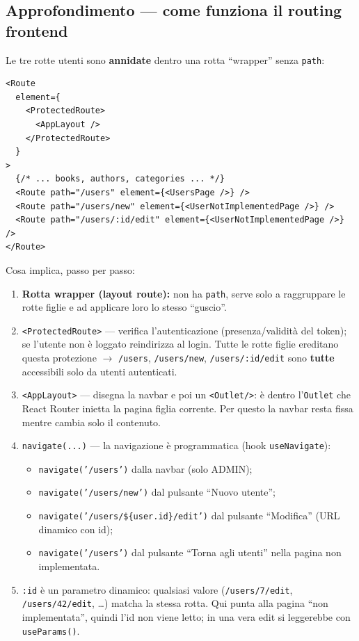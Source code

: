 \documentclass[11pt,a4paper]{article}
\newcommand{\code}[1]{\texttt{\small #1}}
\begin{document}
\subsection{Approfondimento --- come funziona il routing frontend}

Le tre rotte utenti sono \textbf{annidate} dentro una rotta ``wrapper'' senza
\code{path}:

\begin{lstlisting}[language=TypeScriptX]
<Route
  element={
    <ProtectedRoute>
      <AppLayout />
    </ProtectedRoute>
  }
>
  {/* ... books, authors, categories ... */}
  <Route path="/users" element={<UsersPage />} />
  <Route path="/users/new" element={<UserNotImplementedPage />} />
  <Route path="/users/:id/edit" element={<UserNotImplementedPage />} />
</Route>
\end{lstlisting}

Cosa implica, passo per passo:

\begin{enumerate}[leftmargin=1.6em]
  \item \textbf{Rotta wrapper (layout route):} non ha \code{path}, serve solo a
        raggruppare le rotte figlie e ad applicare loro lo stesso ``guscio''.
  \item \code{<ProtectedRoute>} --- verifica l'autenticazione (presenza/validità del
        token); se l'utente non è loggato reindirizza al login. Tutte le rotte
        figlie ereditano questa protezione $\rightarrow$ \code{/users},
        \code{/users/new}, \code{/users/:id/edit} sono \textbf{tutte} accessibili
        solo da utenti autenticati.
  \item \code{<AppLayout>} --- disegna la navbar e poi un \code{<Outlet/>}: è dentro
        l'\code{Outlet} che React Router inietta la pagina figlia corrente. Per
        questo la navbar resta fissa mentre cambia solo il contenuto.
  \item \code{navigate(...)} --- la navigazione è programmatica (hook
        \code{useNavigate}):
        \begin{itemize}[leftmargin=1.2em]
          \item \code{navigate('/users')} dalla navbar (solo ADMIN);
          \item \code{navigate('/users/new')} dal pulsante ``Nuovo utente'';
          \item \code{navigate('/users/\$\{user.id\}/edit')} dal pulsante
                ``Modifica'' (URL dinamico con id);
          \item \code{navigate('/users')} dal pulsante ``Torna agli utenti'' nella
                pagina non implementata.
        \end{itemize}
  \item \code{:id} è un parametro dinamico: qualsiasi valore (\code{/users/7/edit},
        \code{/users/42/edit}, \ldots) matcha la stessa rotta. Qui punta alla pagina
        ``non implementata'', quindi l'id non viene letto; in una vera edit si
        leggerebbe con \code{useParams()}.
\end{enumerate}
\end{document}
